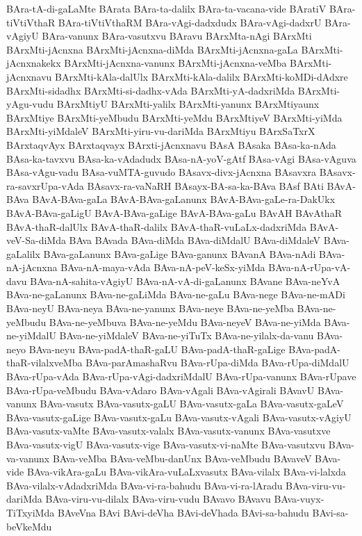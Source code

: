 {BAra-tA-di-gaLaMte
BArata
BAra-ta-dalilx
BAra-ta-vacana-vide
BAratiV
BAra-tiVtiVthaR
BAra-tiVtiVthaRM
BAra-vAgi-dadxdudx
BAra-vAgi-dadxrU
BAra-vAgiyU
BAra-vanunx
BAra-vasutxvu
BAravu
BArxMta-nAgi
BArxMti
BArxMti-jAcnxna
BArxMti-jAcnxna-diMda
BArxMti-jAcnxna-gaLa
BArxMti-jAcnxnakekx
BArxMti-jAcnxna-vanunx
BArxMti-jAcnxna-veMba
BArxMti-jAcnxnavu
BArxMti-kAla-dalUlx
BArxMti-kAla-dalilx
BArxMti-koMDi-dAdxre
BArxMti-sidadhx
BArxMti-si-dadhx-vAda
BArxMti-yA-dadxriMda
BArxMti-yAgu-vudu
BArxMtiyU
BArxMti-yalilx
BArxMti-yanunx
BArxMtiyaunx
BArxMtiye
BArxMti-yeMbudu
BArxMti-yeMdu
BArxMtiyeV
BArxMti-yiMda
BArxMti-yiMdaleV
BArxMti-yiru-vu-dariMda
BArxMtiyu
BArxSaTxrX
BArxtaqvAyx
BArxtaqvayx
BArxti-jAcnxnavu
BAsA
BAsaka
BAsa-ka-nAda
BAsa-ka-tavxvu
BAsa-ka-vAdadudx
BAsa-nA-yoV-gAtf
BAsa-vAgi
BAsa-vAguva
BAsa-vAgu-vadu
BAsa-vuMTA-guvudo
BAsavx-divx-jAcnxna
BAsavxra
BAsavx-ra-savxrUpa-vAda
BAsavx-ra-vaNaRH
BAsayx-BA-sa-ka-BAva
BAsf
BAti
BAvA-BAva
BAvA-BAva-gaLa
BAvA-BAva-gaLanunx
BAvA-BAva-gaLe-ra-DakUkx
BAvA-BAva-gaLigU
BAvA-BAva-gaLige
BAvA-BAva-gaLu
BAvAH
BAvAthaR
BAvA-thaR-dalUlx
BAvA-thaR-dalilx
BAvA-thaR-vuLaLx-dadxriMda
BAvA-veV-Sa-diMda
BAva
BAvada
BAva-diMda
BAva-diMdalU
BAva-diMdaleV
BAva-gaLalilx
BAva-gaLanunx
BAva-gaLige
BAva-ganunx
BAvanA
BAva-nAdi
BAva-nA-jAcnxna
BAva-nA-maya-vAda
BAva-nA-peV-keSx-yiMda
BAva-nA-rUpa-vA-davu
BAva-nA-sahita-vAgiyU
BAva-nA-vA-di-gaLanunx
BAvane
BAva-neYvA
BAva-ne-gaLanunx
BAva-ne-gaLiMda
BAva-ne-gaLu
BAva-nege
BAva-ne-mADi
BAva-neyU
BAva-neya
BAva-ne-yanunx
BAva-neye
BAva-ne-yeMba
BAva-ne-yeMbudu
BAva-ne-yeMbuva
BAva-ne-yeMdu
BAva-neyeV
BAva-ne-yiMda
BAva-ne-yiMdalU
BAva-ne-yiMdaleV
BAva-ne-yiTuTx
BAva-ne-yilalx-da-vanu
BAva-neyo
BAva-neyu
BAva-padA-thaR-gaLU
BAva-padA-thaR-gaLige
BAva-padA-thaR-vilalxveMba
BAva-parAmashaRvu
BAva-rUpa-diMda
BAva-rUpa-diMdalU
BAva-rUpa-vAda
BAva-rUpa-vAgi-dadxriMdalU
BAva-rUpa-vanunx
BAva-rUpave
BAva-rUpa-veMbudu
BAva-vAdaro
BAva-vAgali
BAva-vAgirali
BAvavU
BAva-vanunx
BAva-vasutx
BAva-vasutx-gaLU
BAva-vasutx-gaLa
BAva-vasutx-gaLeV
BAva-vasutx-gaLige
BAva-vasutx-gaLu
BAva-vasutx-vAgali
BAva-vasutx-vAgiyU
BAva-vasutx-vaMte
BAva-vasutx-valalx
BAva-vasutx-vanunx
BAva-vasutxve
BAva-vasutx-vigU
BAva-vasutx-vige
BAva-vasutx-vi-naMte
BAva-vasutxvu
BAva-va-vanunx
BAva-veMba
BAva-veMbu-danUnx
BAva-veMbudu
BAvaveV
BAva-vide
BAva-vikAra-gaLu
BAva-vikAra-vuLaLxvasutx
BAva-vilalx
BAva-vi-lalxda
BAva-vilalx-vAdadxriMda
BAva-vi-ra-bahudu
BAva-vi-ra-lAradu
BAva-viru-vu-dariMda
BAva-viru-vu-dilalx
BAva-viru-vudu
BAvavo
BAvavu
BAva-vuyx-TiTxyiMda
BAveVna
BAvi
BAvi-deVha
BAvi-deVhada
BAvi-sa-bahudu
BAvi-sa-beVkeMdu
}
